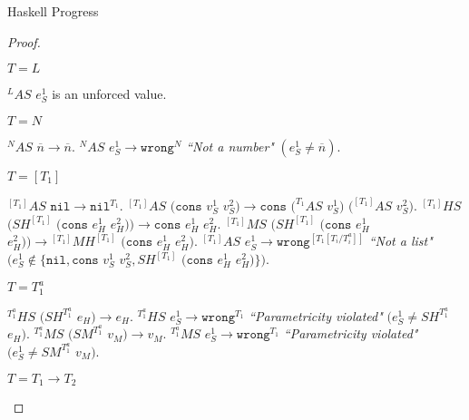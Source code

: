 \begin{theorem}{Haskell Progress}
\begin{proof}
\begin{case}
\begin{subcase}

$T=L$

$^{L}AS$ $e_{S}^{1}$ is an unforced value.

\end{subcase}

\begin{subcase}

$T=N$

$^{N}AS$ $\overline{n}\rightarrow\overline{n}$.  $^{N}AS$ $e_{S}^{1}\rightarrow\mathtt{wrong}^{N}$ \emph{``Not a number"} $(e_{S}^{1}\neq\overline{n})$.

\end{subcase}

\begin{subcase}

$T=[T_{1}]$

$^{[T_{1}]}AS$ $\mathtt{nil}\rightarrow\mathtt{nil}^{T_{1}}$.  $^{[T_{1}]}AS$ $(\mathtt{cons}$ $v_{S}^{1}$ $v_{S}^{2})\rightarrow\mathtt{cons}$ $(^{T_{1}}AS$ $v_{S}^{1})$ $(^{[T_{1}]}AS$ $v_{S}^{2})$.  $^{[T_{1}]}HS$ $(SH^{[T_{1}]}$ $(\mathtt{cons}$ $e_{H}^{1}$ $e_{H}^{2}))\rightarrow\mathtt{cons}$ $e_{H}^{1}$ $e_{H}^{2}$.  $^{[T_{1}]}MS$ $(SH^{[T_{1}]}$ $(\mathtt{cons}$ $e_{H}^{1}$ $e_{H}^{2}))\rightarrow{^{[T_{1}]}M}H^{[T_{1}]}$ $(\mathtt{cons}$ $e_{H}^{1}$ $e_{H}^{2})$.  $^{[T_{1}]}AS$ $e_{S}^{1}\rightarrow\mathtt{wrong}^{[T_{1}[T_{i}/T_{i}^{a}]]}$ \emph{``Not a list"} $(e_{S}^{1}\not\in\lbrace\mathtt{nil},\mathtt{cons}$ $v_{S}^{1}$ $v_{S}^{2},SH^{[T_{1}]}$ $(\mathtt{cons}$ $e_{H}^{1}$ $e_{H}^{2})\rbrace)$.

\end{subcase}

\begin{subcase}

$T=T_{1}^{a}$

$^{T_{1}^{a}}HS$ $(SH^{T_{1}^{a}}$ $e_{H})\rightarrow e_{H}$.  $^{T_{1}^{a}}HS$ $e_{S}^{1}\rightarrow\mathtt{wrong}^{T_{1}}$ \emph{``Parametricity violated"} $(e_{S}^{1}\neq SH^{T_{1}^{a}}$ $e_{H})$.  $^{T_{1}^{a}}MS$ $(SM^{T_{1}^{a}}$ $v_{M})\rightarrow v_{M}$.  $^{T_{1}^{a}}MS$ $e_{S}^{1}\rightarrow\mathtt{wrong}^{T_{1}}$ \emph{``Parametricity violated"} $(e_{S}^{1}\neq SM^{T_{1}^{a}}$ $v_{M})$.

\end{subcase}

\begin{subcase}

$T=T_{1}\rightarrow T_{2}$


\end{subcase}
\end{case}
\end{proof}
\end{theorem}
